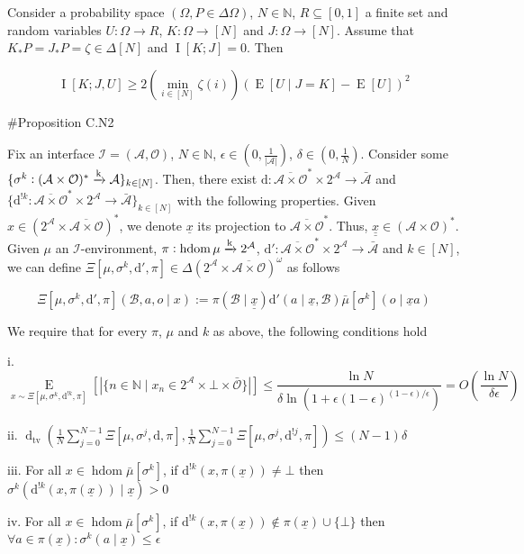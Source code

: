 \documentclass[a4paper]{article}
\newcommand{\E}[1]{\underset{#1}{\operatorname{E}}}
\newcommand{\I}[1]{\underset{#1}{\operatorname{I}}}
\newcommand{\D}{\mathrm{d}}
\newcommand{\Dtv}{\operatorname{d}_{\text{tv}}}
\newcommand{\Nats}{\mathbb{N}}
\newcommand{\Abs}[1]{\left\vert #1 \right\vert}
\newcommand{\M}{\xrightarrow{\textnormal{k}}}
\newcommand{\Ob}{\mathcal{O}}
\newcommand{\A}{\mathcal{A}}
\newcommand{\In}{\mathcal{I}}
\newcommand{\FH}{(\A \times \Ob)^*}
\newcommand{\Ada}{\bar{\A}}
\newcommand{\Adao}{\overline{\A \times \Ob}}
\newcommand{\Adfh}{\Adao^*}
\DeclareMathOperator{\HD}{hdom}
\newcommand{\B}{\mathcal{B}}
\newcommand{\J}{J}
\begin{document}
Consider a probability space $(\Omega, P \in \Delta\Omega)$, $N \in \Nats$, $R \subseteq [0,1]$ a finite set and random variables $U: \Omega \rightarrow R$, $K: \Omega \rightarrow [N]$ and $\J: \Omega \rightarrow [N]$. Assume that $K_*P = J_*P = \zeta \in \Delta[N]$ and $\I{}[K;J] = 0$. Then

$$\I{}\left[K;J,U\right] \geq 2 \left(\min_{i \in [N]} {\zeta(i)}\right) \left(\E{}\left[U \mid J = K\right]-\E{}\left[U\right]\right)^2$$

\#Proposition C.N2

Fix an interface $\In=(\A,\Ob)$, $N \in \Nats$, $\epsilon \in (0,\frac{1}{\Abs{\A}})$, $\delta \in (0,\frac{1}{N})$. Consider some $\{\sigma^k: \FH \M \A\}_{k \in [N]}$. Then, there exist $\D: \Adfh \times 2^\A \rightarrow \Ada$ and $\{\D^{!k}: \Adfh \times 2^\A \rightarrow \Ada\}_{k \in [N]}$ with the following properties. Given $x \in \left(2^\A \times \Adao\right)^*$, we denote $\underline{x}$ its projection to $\Adfh$. Thus, $\underline{\underline{x}}\in\FH$.
Given  $\mu$ an $\In$-environment, $\pi: \HD{\mu} \M 2^\A$, $\D': \Adfh \times 2^\A \rightarrow \Ada$ and $k \in [N]$, we can define $\Xi\left[\mu,\sigma^k,\D',\pi\right]\in \Delta\left(2^\A \times \Adao\right)^\omega$ as follows
 
$$\Xi\left[\mu,\sigma^k,\D',\pi\right]\left(\B,a,o \mid x\right):=\pi\left(\B \mid \underline{\underline{x}}\right)\D'\left(a \mid \underline{x},\B\right) \bar{\mu}[\sigma^k]\left(o \mid \underline{x}a\right)$$

We require that for every $\pi$, $\mu$ and $k$ as above, the following conditions hold

i. $$\E{x \sim\Xi\left[\mu,\sigma^k,\D^{!k},\pi\right]}\left[\Abs{\{n \in \Nats \mid x_n \in 2^\A \times \bot \times \bar{\Ob}\}}\right] \leq \frac{\ln N}{\delta \ln\left(1 + \epsilon(1-\epsilon)^{(1-\epsilon)/\epsilon}\right)}=O\left(\frac{\ln N}{\delta \epsilon}\right)$$

ii. $\Dtv\left(\frac{1}{N}\sum_{j=0}^{N-1}{\Xi\left[\mu,\sigma^j,\D,\pi\right]},\frac{1}{N}\sum_{j=0}^{N-1}{\Xi\left[\mu,\sigma^j,\D^{!j},\pi\right]}\right) \leq (N-1)\delta$

iii. For all $x \in \HD{\bar{\mu}[\sigma^k]}$, if $\D^{!k}\left(x,\pi\left(\underline{x}\right)\right) \ne \bot$ then $\sigma^k\left(\D^{!k}\left(x,\pi\left(\underline{x}\right)\right) \mid \underline{x}\right) > 0$

iv. For all $x \in \HD{\bar{\mu}[\sigma^k]}$, if $\D^{!k}\left(x,\pi\left(\underline{x}\right)\right) \not\in \pi\left(\underline{x}\right) \cup \{\bot\}$ then $\forall a \in \pi\left(\underline{x}\right): \sigma^k\left(a \mid \underline{x}\right) \leq \epsilon$
\end{document}
